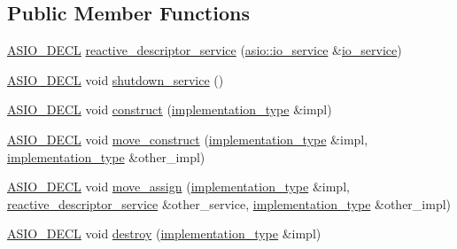 \subsection*{Public Member Functions}
\begin{DoxyCompactItemize}
\item 
\hyperlink{config_8hpp_ab54d01ea04afeb9a8b39cfac467656b7}{A\+S\+I\+O\+\_\+\+D\+E\+C\+L} \hyperlink{classasio_1_1detail_1_1reactive__descriptor__service_a96766ccbfd8ca4f01bd2d16771740dfa}{reactive\+\_\+descriptor\+\_\+service} (\hyperlink{classasio_1_1io__service}{asio\+::io\+\_\+service} \&\hyperlink{classasio_1_1io__service}{io\+\_\+service})
\item 
\hyperlink{config_8hpp_ab54d01ea04afeb9a8b39cfac467656b7}{A\+S\+I\+O\+\_\+\+D\+E\+C\+L} void \hyperlink{classasio_1_1detail_1_1reactive__descriptor__service_ae31c84cf62b71099dd132baa065e18f7}{shutdown\+\_\+service} ()
\item 
\hyperlink{config_8hpp_ab54d01ea04afeb9a8b39cfac467656b7}{A\+S\+I\+O\+\_\+\+D\+E\+C\+L} void \hyperlink{classasio_1_1detail_1_1reactive__descriptor__service_ac58db90369cee83067bff0c07376a55e}{construct} (\hyperlink{classasio_1_1detail_1_1reactive__descriptor__service_1_1implementation__type}{implementation\+\_\+type} \&impl)
\item 
\hyperlink{config_8hpp_ab54d01ea04afeb9a8b39cfac467656b7}{A\+S\+I\+O\+\_\+\+D\+E\+C\+L} void \hyperlink{classasio_1_1detail_1_1reactive__descriptor__service_ac374620d2cdbd8a0d8335cc563abd478}{move\+\_\+construct} (\hyperlink{classasio_1_1detail_1_1reactive__descriptor__service_1_1implementation__type}{implementation\+\_\+type} \&impl, \hyperlink{classasio_1_1detail_1_1reactive__descriptor__service_1_1implementation__type}{implementation\+\_\+type} \&other\+\_\+impl)
\item 
\hyperlink{config_8hpp_ab54d01ea04afeb9a8b39cfac467656b7}{A\+S\+I\+O\+\_\+\+D\+E\+C\+L} void \hyperlink{classasio_1_1detail_1_1reactive__descriptor__service_a9975dbd0b1c030fa8026a418bdcaa639}{move\+\_\+assign} (\hyperlink{classasio_1_1detail_1_1reactive__descriptor__service_1_1implementation__type}{implementation\+\_\+type} \&impl, \hyperlink{classasio_1_1detail_1_1reactive__descriptor__service}{reactive\+\_\+descriptor\+\_\+service} \&other\+\_\+service, \hyperlink{classasio_1_1detail_1_1reactive__descriptor__service_1_1implementation__type}{implementation\+\_\+type} \&other\+\_\+impl)
\item 
\hyperlink{config_8hpp_ab54d01ea04afeb9a8b39cfac467656b7}{A\+S\+I\+O\+\_\+\+D\+E\+C\+L} void \hyperlink{classasio_1_1detail_1_1reactive__descriptor__service_ae49454cc555d097391e35b74cb99f79a}{destroy} (\hyperlink{classasio_1_1detail_1_1reactive__descriptor__service_1_1implementation__type}{implementation\+\_\+type} \&impl)

\end{DoxyCompactItemize}
